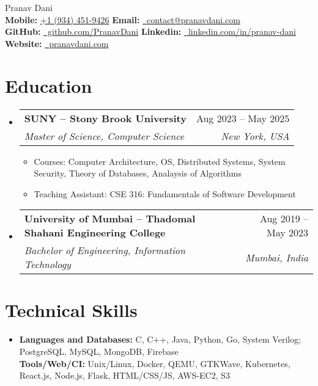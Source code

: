 \documentclass[letterpaper,11pt]{article}
\makeatletter
\newcommand{\resumeItem}[1]{
  \item\small{
    {#1 \vspace{-2pt}}
  }
}
\newcommand{\resumeSubheading}[4]{
  \vspace{-2pt}\item
    \begin{tabular*}{1.0\textwidth}[t]{l@{\extracolsep{\fill}}r}
      \vspace{-2pt}\textbf{#1} & \small #2 \\
      \textit{\small#3} & \textit{\small #4} \\
    \end{tabular*}\vspace{-7pt}
}
\newcommand{\resumeSubHeadingListStart}{\begin{itemize}[leftmargin=0.0in, label={}]}
\newcommand{\resumeSubHeadingListEnd}{\end{itemize}}
\newcommand{\resumeItemListStart}{\begin{itemize}}
\newcommand{\resumeItemListEnd}{\end{itemize}\vspace{-5pt}}
\makeatother
\begin{document}

\begin{center}
  {\huge Pranav Dani} \\[4pt]
  \small
  \textbf{Mobile:} \href{tel:+19344529426}{+1 (934) 451-9426}
  \quad   \faEnvelope \textbf{ Email:} \href{mailto:contact@pranavdani.com}{\raisebox{-0.2\height}\    contact@pranavdani.com}\\
  \faGithub \textbf{ GitHub:} \href{https://github.com/PranavDani}{\raisebox{-0.2\height}\  github.com/PranavDani} \quad
  \faLinkedin \textbf{ Linkedin:} \href{https://linkedin.com/in/pranav-dani}{\raisebox{-0.2\height}\  linkedin.com/in/pranav-dani} \quad
  \faGlobe \textbf{ Website:} \href{https://pranavdani.com}{\raisebox{-0.1\height}\ pranavdani.com}
  \vspace{-10pt}
\end{center}


\section{Education}
\resumeSubHeadingListStart
\resumeSubheading
{SUNY -- Stony Brook University}{Aug 2023 -- May 2025}
{Master of Science, Computer Science}{New York, USA}
\resumeItemListStart
\resumeItem{Courses: Computer Architecture, OS, Distributed Systems, System Security, Theory of Databases, Analaysis of Algorithms}
\vspace{-2pt}
\resumeItem{Teaching Assistant: CSE 316: Fundamentals of Software Development}
\resumeItemListEnd
\vspace{-3pt}

\resumeSubheading
{University of Mumbai -- Thadomal Shahani Engineering College}{Aug 2019 -- May 2023}
{Bachelor of Engineering, Information Technology}{Mumbai, India}
\resumeSubHeadingListEnd


\section{Technical Skills}
\begin{itemize}[leftmargin=0.2in, label={}]
  \item \textbf{Languages and Databases:} C, C++, Java, Python, Go, System Verilog; PostgreSQL, MySQL, MongoDB, Firebase\\
        \textbf{Tools/Web/CI:} Unix/Linux, Docker, QEMU, GTKWave, Kubernetes,  React.js, Node.js, Flask, HTML/CSS/JS, AWS-EC2, S3
\end{itemize}
\vspace{-16pt}
\end{document}
